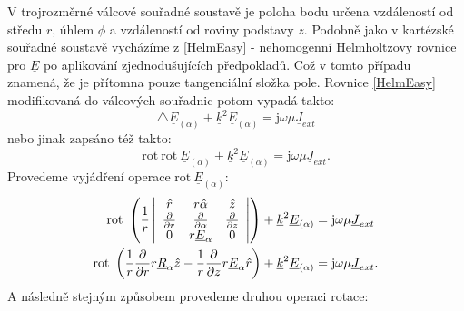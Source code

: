 \documentclass[12pt,a4paper,oneside]{article}
\numberwithin{equation}{section} %
\numberwithin{figure}{section} %
\numberwithin{table}{section} %
\newcommand{\mj}{\mathrm{j}} %
\newcommand{\faz}[1]{{\underline{#1}}} %
\newcommand{\rot}{\mathrm{rot}\ }
\begin{document}
V trojrozměrné válcové souřadné soustavě je poloha bodu určena vzdáleností od středu $r$, úhlem $\phi$ a vzdáleností od roviny podstavy $z$. Podobně jako v kartézské souřadné soustavě vycházíme z \ref{HelmEasy} - nehomogenní Helmholtzovy rovnice pro $\faz{E}$ po aplikování zjednodušujících předpokladů. Což v tomto případu znamená, že je přítomna pouze tangenciální složka pole. Rovnice \ref{HelmEasy} modifikovaná do válcových souřadnic potom vypadá takto:
\begin{equation}
\triangle \faz{E} _{(\alpha)} + \faz{k} ^2 \faz{E} _{(\alpha)} = \mj \omega \mu \faz{J} _{ext} 
\end{equation}
nebo jinak zapsáno též takto:
\begin{equation}
\rot \rot \faz{E} _{(\alpha)} + \faz{k} ^2 \faz{E} _{(\alpha)} = \mj \omega \mu \faz{J} _{ext} .
\end{equation}
Provedeme vyjádření operace $\rot \faz{E} _{(\alpha)}$:
\begin{subequations}
\begin{align}
\rot \left( \frac{1}{r} \left|
\begin{array}{c c c}
\hat{r} & r\hat{\alpha} & \hat{z} \\
\frac{\partial}{\partial r} & \frac{\partial}{\partial \alpha} & \frac{\partial}{\partial z} \\
0 & r\faz{E} _{\alpha} & 0
\end{array} \right| \right)
+ \faz{k} ^2 \faz{E} _{(\alpha)} &= \mj \omega \mu \faz{J} _{ext} 
\\
\rot \left( \frac{1}{r} \frac{\partial}{\partial r} r \faz{R} _{\alpha} \hat{z} - \frac{1}{r} \frac{\partial}{\partial z} r \faz{E} _{\alpha} \hat{r} \right) + \faz{k} ^2 \faz{E} _{(\alpha)} &= \mj \omega \mu \faz{J} _{ext} .
\end{align}
\end{subequations}
A následně stejným způsobem provedeme druhou operaci rotace:
\end{document}
